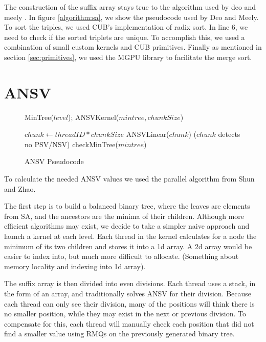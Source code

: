 The construction of the suffix array stays true to the algorithm used by deo and meely \cite{Deo}.
In figure \ref{algorithm:sa}, we show the pseudocode used by Deo and Meely.
To sort the triples, we used CUB's implementation of radix sort.
In line 6, we need to check if the sorted triplets are unique.
To accomplish this, we used a combination of small custom kernels and CUB primitives.
Finally as mentioned in section \ref{sec:primitives}, we used the MGPU library to facilitate the merge sort.

\section{ANSV}

\begin{figure}
\begin{algorithmic}[1]
\State MinTree($level$);
\EndFor
\State ANSVKernel($mintree,chunkSize$)
\EndProcedure
\end{algorithmic}
\begin{algorithmic}[1]
\State $chunk \gets threadID * chunkSize$
\State ANSVLinear($chunk$)
\If($chunk$ detects no PSV/NSV)
\State checkMinTree($mintree$)
\EndIf
\EndProcedure
\end{algorithmic}
\caption{ANSV Pseudocode}
\label{algorithm:ansv}
\end{figure}

To calculate the needed ANSV values we used the parallel algorithm from Shun and Zhao\cite{shun2013practical}.

The first step is to build a balanced binary tree, where the leaves are elements from SA, and the ancestors are the minima of their children.
Although more efficient algorithms may exist, we decide to take a simpler naive approach and launch a kernel at each level.
Each thread in the kernel calculates for a node the minimum of its two children and stores it into a 1d array.
A 2d array would be easier to index into, but much more difficult to allocate.
(Something about memory locality and indexing into 1d array).

The suffix array is then divided into even divisions.
Each thread uses a stack, in the form of an array, and traditionally solves ANSV for their division.
Because each thread can only see their division, many of the positions will think there is no smaller position, while they may exist in the next or previous division.
To compensate for this, each thread will manually check each position that did not find a smaller value using RMQs on the previously generated binary tree.

